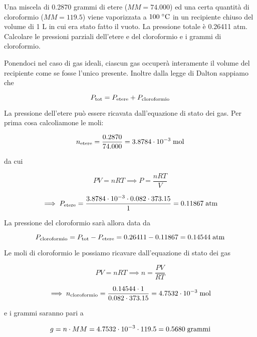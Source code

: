 \newpage

\begin{esercizio}
    Una miscela di 0.2870 grammi di etere ($MM=74.000$) ed una certa quantità di cloroformio ($MM=119.5$) viene vaporizzata a $100 \; \rm ^{\circ} C$ in un recipiente chiuso del volume di 1 L in cui era stato fatto il vuoto. La pressione totale è 0.26411 atm. Calcolare le pressioni parziali dell'etere e del cloroformio e i grammi di cloroformio.
\end{esercizio}
\begin{soluzione}
    Ponendoci nel caso di gas ideali, ciascun gas occuperà interamente il volume del recipiente come se fosse l'unico presente. Inoltre dalla legge di Dalton sappiamo che

$$P_{\rm tot}=P_{\rm etere} + P_{\rm cloroformio}$$

La pressione dell'etere può essere ricavata dall'equazione di stato dei gas. Per prima cosa calcoliamone le moli:

$$n_{\rm etere}=\frac{0.2870}{74.000}
=3.8784 \cdot 10^{-3} \; \rm mol$$

da cui

$$PV=nRT 
\implies
P=\frac{nRT}{V}$$

$$\implies P_{\rm etere}
=\frac{3.8784 \cdot 10^{-3} \cdot 0.082 \cdot 373.15}{1}
=0.11867 \; \rm atm$$

La pressione del cloroformio sarà allora data da

$$P_{\rm cloroformio}
=P_{\rm tot} - P_{\rm etere}
=0.26411-0.11867
=0.14544 \; \rm atm$$

Le moli di cloroformio le possiamo ricavare dall'equazione di stato dei gas

$$PV=nRT
\implies
n=\frac{PV}{RT}$$

$$\implies
n_{\rm cloroformio}=\frac{0.14544 \cdot 1}{0.082 \cdot 373.15}
=4.7532 \cdot 10^{-3} \; \rm mol$$

e i grammi saranno pari a

$$g=n \cdot MM=4.7532 \cdot 10^{-3} \cdot 119.5=0.5680 \; \rm grammi$$
\end{soluzione}

\newpage


